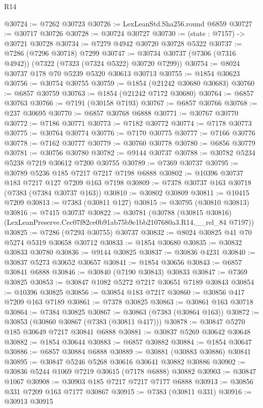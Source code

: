 \begin{lexlean}{R14}
\begin{coremodule}
@30724 := @7262 @30723
@30726 := LexLeanStd.Sha256.round @6859
@30727 := @30717 @30726
@30728 := @30724 @30727
@30730 := (state : @7157) -> @30721 @30728
@30734 := @7279 @4942 @30720 @30728 @5322
@30737 := @7286 (@7296 @30718) @7299
@30747 := @30734 @30737 (@7306 (@7316 @4942)) (@7322 (@7323 (@7324 @5322) @30720 @7299))
@30754 := @8024 @30737 @178 @70 @5239 @5320 @30613 @30713
@30755 := @1854 @30623
@30756 := @30754 @30755
@30759 := @1854 (@21242 @30680 @30683)
@30760 := @6857 @30759
@30763 := @1854 (@21242 @7172 @30680)
@30764 := @6857 @30763
@30766 := @7191 (@30158 @7193)
@30767 := @6857 @30766
@30768 := @237 @30695
@30770 := @6857 @30768 @6888
@30771 := @30767 @30770
@30772 := @7186 @30771
@30773 := @7182 @30772
@30774 := @7178 @30773
@30775 := @30764 @30774
@30776 := @7170 @30775
@30777 := @7166 @30776
@30778 := @7162 @30777
@30779 := @30760 @30778
@30780 := @6856 @30779
@30781 := @30756 @30780
@30782 := @9144 @30737
@30788 := @30782 @5234 @5238 @7219 @30612 @7200 @30755
@30789 := @7369 @30737
@30795 := @30789 @5236 @185 @7217 @7217 @7198 @6888
@30802 := @10396 @30737 @183 @7217 @127 @7209 @163 @7198
@30809 := @7378 @30737 @163 @30718 (@7383 (@7384 @30737 @163))
@30810 := @30802 @30809
@30811 := @10415 @7209
@30813 := @7383 (@30811 @127)
@30815 := @30795 (@30810 @30813)
@30816 := @7415 @30737
@30822 := @30781
    (@30788 (@30815 @30816) (LexLeanPreserve.Cec07f82ce0b91ab75b9e1bb2107680a3.R14.__rel_84 @7197))
@30825 := @7286 (@7293 @30755) @30737
@30832 := @8024 @30825 @41 @70 @5274 @5319 @30658 @30712
@30833 := @1854 @30680
@30835 := @30832 @30833 @30780
@30836 := @9144 @30825
@30837 := @30836 @4231
@30840 := @30837 @5273 @30652 @30657
@30841 := @1854 @30656
@30843 := @6857 @30841 @6888
@30846 := @30840 (@7190 @30843) @30833
@30847 := @7369 @30825
@30853 := @30847 @1082 @5272 @7217 @30651 @7189 @30843
@30854 := @10396 @30825
@30856 := @30854 @183 @7217
@30860 := @30856 @417 @7209 @163 @7189
@30861 := @7378 @30825
@30863 := @30861 @163 @30718
@30864 := @7384 @30825
@30867 := @30863 (@7383 (@30864 @163))
@30872 := @30853 (@30860 @30867 (@7383 (@30811 @417)))
@30878 := @30847 @5270 @185 @30649 @7217 @30841 @6888
@30881 := @30837 @5269 @30642 @30648
@30882 := @1854 @30644
@30883 := @6857 @30882
@30884 := @1854 @30647
@30886 := @6857 @30884 @6888
@30889 := @30881 (@30883 @30886) @30841
@30895 := @30847 @5246 @5268 @30616 @30641 @30882 @30886
@30902 := @30836 @5244 @1069 @7219 @30615 (@7178 @6888) @30882
@30903 := @30847 @1067
@30908 := @30903 @185 @7217 @7217 @7177 @6888
@30913 := @30856 @331 @7209 @163 @7177 @30867
@30915 := @7383 (@30811 @331)
@30916 := @30913 @30915

\end{coremodule}
\end{lexlean}
